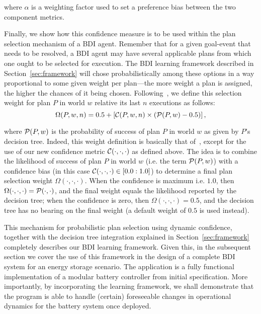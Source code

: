 \noindent
where $\alpha$ is a weighting factor used to set a preference bias between the two component metrics.



Finally, we show how this confidence measure is to be used within the plan selection mechanism of a BDI agent. Remember that for a given goal-event that needs to be resolved, a BDI agent may have several applicable plans from which one ought to be selected for execution. The BDI learning framework described in Section~\ref{sec:framework} will chose probabilistically among these options in a way proportional to some given weight per plan---the more weight a plan is assigned, the higher the chances of it being chosen. 
Following~\cite{singh10:extending, singh10:learning}, we define this selection weight for plan $P$ in world $w$ relative its last $n$ executions as follows: 
\[
	\Omega(P,w,n) = 0.5 + \left[  \C(P,w,n) \times  \left( \P(P,w) - 0.5 \right)  \right],
\label{eqn:omega}   
\]

\noindent 
where $\P(P,w)$ is the probability of success of plan $P$ in world $w$ as given by $P$'s decision tree. 
%
Indeed, this weight definition is basically that of~\cite{singh10:extending, singh10:learning}, except for the use of our new confidence metric $\C(\cdot,\cdot,\cdot)$ as defined above. The idea is to combine the likelihood of success of plan $P$ in world $w$ (i.e. the term $\P(P,w)$) with a confidence bias (in this case $\C(\cdot,\cdot,\cdot) \in [0.0:1.0]$) to determine a final plan selection weight $\Omega(\cdot,\cdot,\cdot)$. 
When the confidence is maximum i.e. $1.0$, then $\Omega(\cdot,\cdot,\cdot) = \P(\cdot,\cdot)$, and the final weight equals the likelihood reported by the decision tree; when the confidence is zero, then $\Omega(\cdot,\cdot,\cdot)=0.5$, and the decision tree has no bearing on the final weight (a default weight of $0.5$ is used instead).


This mechanism for probabilistic plan selection using dynamic confidence, together with the decision tree integration explained in Section~\ref{sec:framework} completely describes our BDI learning framework. Given this, in the subsequent section we cover the use of this framework in the design of a complete BDI system for an energy storage scenario. The application is a fully functional implementation of a modular battery controller from initial specification. More importantly, by incorporating the learning framework, we shall demonstrate that the program is able to handle (certain) foreseeable changes in operational dynamics for the battery system once deployed.

